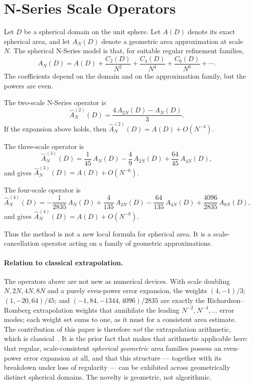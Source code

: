 \documentclass[11pt]{article}
\begin{document}
\section{N-Series Scale Operators}
Let $D$ be a spherical domain on the unit sphere. Let $A(D)$ denote its exact spherical
area, and let $A_N(D)$ denote a geometric area approximation at scale $N$. The spherical
N-Series model is that, for suitable regular refinement families,
\[
A_N(D) = A(D) + \frac{C_2(D)}{N^2} + \frac{C_4(D)}{N^4} + \frac{C_6(D)}{N^6} + \cdots .
\]
The coefficients depend on the domain and on the approximation family, but the powers are
even.

The two-scale N-Series operator is
\[
\widehat{A}^{(2)}_N(D) = \frac{4\,A_{2N}(D) - A_N(D)}{3}.
\]
If the expansion above holds, then $\widehat{A}^{(2)}_N(D) = A(D) + O(N^{-4})$.

The three-scale operator is
\[
\widehat{A}^{(3)}_N(D) = \frac{1}{45}\,A_N(D) - \frac{4}{9}\,A_{2N}(D) + \frac{64}{45}\,A_{4N}(D),
\]
and gives $\widehat{A}^{(3)}_N(D) = A(D) + O(N^{-6})$.

The four-scale operator is
\[
\widehat{A}^{(4)}_N(D) = -\frac{1}{2835}\,A_N(D) + \frac{4}{135}\,A_{2N}(D)
   - \frac{64}{135}\,A_{4N}(D) + \frac{4096}{2835}\,A_{8N}(D),
\]
and gives $\widehat{A}^{(4)}_N(D) = A(D) + O(N^{-8})$.

Thus the method is not a new local formula for spherical area. It is a scale-cancellation
operator acting on a family of geometric approximations.

\paragraph{Relation to classical extrapolation.}
The operators above are not new as numerical devices. With scale doubling $N,2N,4N,8N$ and
a purely even-power error expansion, the weights $(4,-1)/3$; $(1,-20,64)/45$; and
$(-1,84,-1344,4096)/2835$ are exactly the Richardson--Romberg extrapolation weights that
annihilate the leading $N^{-2}, N^{-4}, \dots$ error modes; each weight set sums to one, as
it must for a consistent area estimate. The contribution of this paper is therefore
\emph{not} the extrapolation arithmetic, which is classical~\cite{richardson}. It is the
prior fact that makes that arithmetic applicable here: that regular, scale-consistent
\emph{spherical geometric} area families possess an even-power error expansion at all, and
that this structure --- together with its breakdown under loss of regularity --- can be
exhibited across geometrically distinct spherical domains. The novelty is geometric, not
algorithmic.
\end{document}
